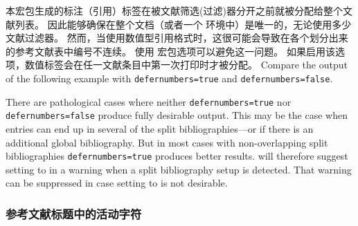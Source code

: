 本宏包生成的标注（引用）标签在被文献筛选(过滤)器分开之前就被分配给整个文献列表。
因此能够确保在整个文档（或者一个  环境中）是唯一的，无论使用多少文献过滤器。
然而，当使用数值型引用格式时，这很可能会导致在各个划分出来的参考文献表中编号不连续。
使用  宏包选项可以避免这一问题。
如果启用该选项，数值标签会在任一文献条目中第一次打印时才被分配。
Compare the output of the following example with \texttt{defernumbers=true} and \texttt{defernumbers=false}.
%

There are pathological cases where neither \texttt{defernumbers=true} nor \texttt{defernumbers=false} produce fully desirable output. This may be the case when entries can end up in several of the split bibliographies---or if there is an additional global bibliography. But in most cases with non-overlapping split bibliographies \texttt{defernumbers=true} produces better results.  will therefore suggest setting  to  in a warning when a split bibliography setup is detected. That warning can be suppressed in case setting  to  is not desirable.

\subsubsection{参考文献标题中的活动字符}%
\label{use:cav:act}


